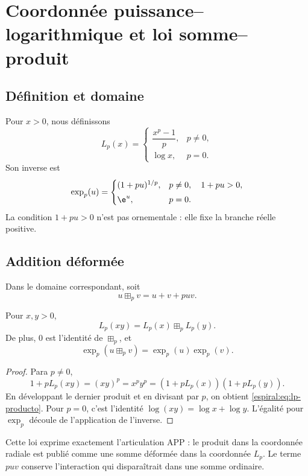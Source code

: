 \chapter{Coordonnée puissance--logarithmique et loi somme--produit}

\section{Définition et domaine}

Pour \(x>0\), nous définissons
\begin{equation}
 L_p(x)=
 \begin{cases}
 \dfrac{x^p-1}{p},&p\neq0,\\[2mm]
 \log x,&p=0.
 \end{cases}
 \label{espiral:eq:lp-def}
\end{equation}
Son inverse est
\begin{equation}
 \exp_p(u)=
 \begin{cases}
 (1+pu)^{1/p},&p\neq0,\quad1+pu>0,\\[1mm]
 \e^u,&p=0.
 \end{cases}
 \label{espiral:eq:exp-p}
\end{equation}
La condition \(1+pu>0\) n'est pas ornementale : elle fixe la branche réelle positive.

\section{Addition déformée}

Dans le domaine correspondant, soit
\[
 u\boxplus_pv=u+v+puv.
\]

\begin{theorem}
Pour \(x,y>0\),
\begin{equation}
 L_p(xy)=L_p(x)\boxplus_pL_p(y).
 \label{espiral:eq:lp-producto}
\end{equation}
De plus, \(0\) est l'identité de \(\boxplus_p\), et
\[
 \exp_p(u\boxplus_pv)=\exp_p(u)\exp_p(v).
\]
\end{theorem}
\begin{proof}
Para \(p\neq0\),
\[
 1+pL_p(xy)=(xy)^p=x^py^p
 =(1+pL_p(x))(1+pL_p(y)).
\]
En développant le dernier produit et en divisant par \(p\), on obtient \cref{espiral:eq:lp-producto}. Pour \(p=0\), c'est l'identité \(\log(xy)=\log x+\log y\). L'égalité pour \(\exp_p\) découle de l'application de l'inverse.
\end{proof}

Cette loi exprime exactement l'articulation APP : le produit dans la coordonnée radiale est publié comme une somme déformée dans la coordonnée \(L_p\). Le terme \(puv\) conserve l'interaction qui disparaîtrait dans une somme ordinaire.

